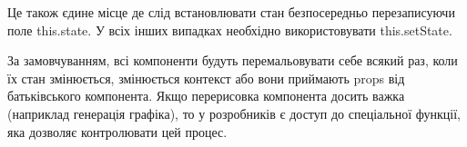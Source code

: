 Це також єдине місце де слід встановлювати стан безпосередньо перезаписуючи поле this.state. У всіх інших випадках необхідно використовувати this.setState.

За замовчуванням, всі компоненти будуть перемальовувати себе всякий раз, коли їх стан змінюється, змінюється контекст або вони приймають props від батьківського компонента. Якщо перерисовка компонента досить важка (наприклад генерація графіка), то у розробників є доступ до спеціальної функції, яка дозволяє контролювати цей процес.
